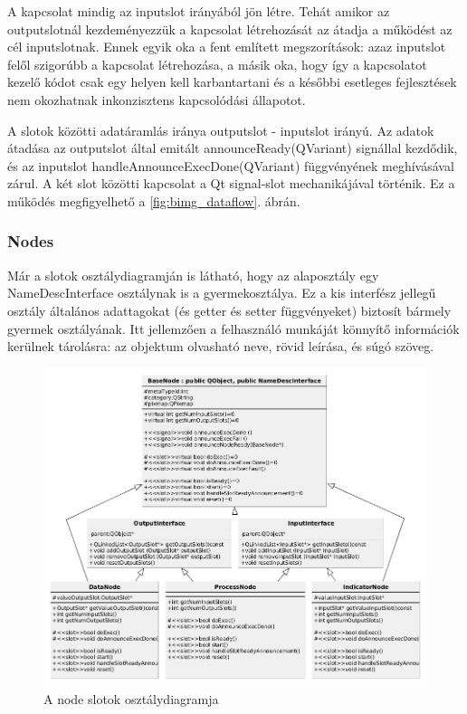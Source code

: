 \documentclass[a4paper,12pt,oneside]{report}
\begin{document}
A kapcsolat mindig az inputslot irányából jön létre. Tehát amikor az outputslotnál kezdeményezzük a kapcsolat létrehozását az átadja a működést az cél inputslotnak. Ennek egyik oka a fent említett megszorítások: azaz inputslot felől szigorúbb a kapcsolat létrehozása, a másik oka, hogy így a kapcsolatot kezelő kódot csak egy helyen kell karbantartani és a későbbi esetleges fejlesztések nem okozhatnak inkonzisztens kapcsolódási állapotot.

A slotok közötti adatáramlás iránya outputslot - inputslot irányú. Az adatok átadása az outputslot által emitált announceReady(QVariant) signállal kezdődik, és az inputslot handleAnnounceExecDone(QVariant) függvényének meghívásával zárul. A két slot közötti kapcsolat a Qt signal-slot mechanikájával történik. Ez a működés megfigyelhető a \ref{fig:bimg_dataflow}. ábrán.

\subsubsection{Nodes}
Már a slotok osztálydiagramján is látható, hogy az alaposztály egy NameDescInterface osztálynak is a gyermekosztálya. Ez a kis interfész jellegű osztály általános adattagokat (és getter és setter függvényeket) biztosít bármely gyermek osztályának. Itt jellemzően a felhasználó munkáját könnyítő információk kerülnek tárolásra: az objektum olvasható neve, rövid leírása, és súgó szöveg.

\begin{center}
\begin{figure}[h]
  \includegraphics[width=1.1\textwidth]{node_class_diag.png}
  \caption{A node slotok osztálydiagramja }

  \label{fig:bimg_slot_diag}
\end{figure}
\end{center}
\end{document}
